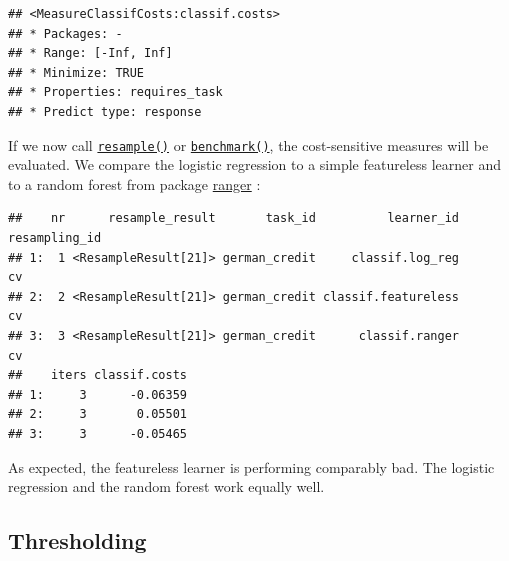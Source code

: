 \documentclass[
]{scrbook}
\newenvironment{Shaded}{\begin{snugshade}}{\end{snugshade}}
\newcommand{\AttributeTok}[1]{\textcolor[rgb]{0.77,0.63,0.00}{#1}}
\newcommand{\DecValTok}[1]{\textcolor[rgb]{0.00,0.00,0.81}{#1}}
\newcommand{\FunctionTok}[1]{\textcolor[rgb]{0.00,0.00,0.00}{#1}}
\newcommand{\NormalTok}[1]{#1}
\newcommand{\OtherTok}[1]{\textcolor[rgb]{0.56,0.35,0.01}{#1}}
\newcommand{\SpecialCharTok}[1]{\textcolor[rgb]{0.00,0.00,0.00}{#1}}
\newcommand{\StringTok}[1]{\textcolor[rgb]{0.31,0.60,0.02}{#1}}
\renewenvironment{Shaded} {\begin{snugshade}\small} {\end{snugshade}}
\begin{document}
\begin{verbatim}
## <MeasureClassifCosts:classif.costs>
## * Packages: -
## * Range: [-Inf, Inf]
## * Minimize: TRUE
## * Properties: requires_task
## * Predict type: response
\end{verbatim}

If we now call \href{https://mlr3.mlr-org.com/reference/resample.html}{\texttt{resample()}} or \href{https://mlr3.mlr-org.com/reference/benchmark.html}{\texttt{benchmark()}}, the cost-sensitive measures will be evaluated.
We compare the logistic regression to a simple featureless learner and to a random forest from package \href{https://cran.r-project.org/package=ranger}{ranger} :

\begin{Shaded}
\end{Shaded}

\begin{verbatim}
##    nr      resample_result       task_id          learner_id resampling_id
## 1:  1 <ResampleResult[21]> german_credit     classif.log_reg            cv
## 2:  2 <ResampleResult[21]> german_credit classif.featureless            cv
## 3:  3 <ResampleResult[21]> german_credit      classif.ranger            cv
##    iters classif.costs
## 1:     3      -0.06359
## 2:     3       0.05501
## 3:     3      -0.05465
\end{verbatim}

As expected, the featureless learner is performing comparably bad.
The logistic regression and the random forest work equally well.

\hypertarget{thresholding}{%
\subsection{Thresholding}\label{thresholding}}
\end{document}
